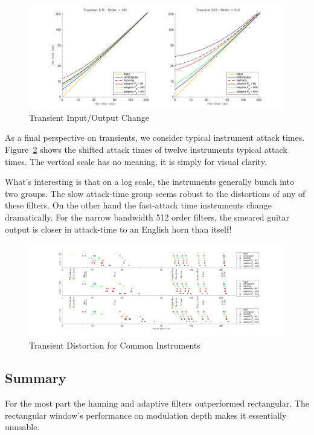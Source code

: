 \documentclass [11pt, proquest] {uwthesis}[2015/03/03]
\begin{document}
\begin{figure}[!ht]
  \centering
    \includegraphics[width=1\textwidth]{transient_2}
    \caption{Transient Input/Output Change}\label{fig:transient_2}
\end{figure}

As a final perspective on transients, we consider typical instrument attack times.  Figure~\ref{fig:transient_3} shows the shifted attack times of twelve instruments typical attack times.  The vertical scale has no meaning, it is simply for visual clarity.

What's interesting is that on a log scale, the instruments generally bunch into two groups.  The slow attack-time group seems robust to the distortions of any of these filters.  On the other hand the fast-attack time instruments change dramatically.  For the narrow bandwidth 512 order filters, the smeared guitar output is closer in attack-time to an English horn than itself!

\begin{figure}[!ht]
  \centering
    \includegraphics[width=1.2\textwidth]{transient_3}
    \caption{Transient Distortion for Common Instruments}\label{fig:transient_3}
\end{figure}


\subsection{Summary}

For the most part the hanning and adaptive filters outperformed rectangular.  The rectangular window's performance on modulation depth makes it essentially unusable.
\end{document}
